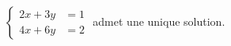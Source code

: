 $\begin{cases}2x+3y &= 1 \\ 4x+6y &= 2\end{cases}$ admet une unique solution.

\begin{reponses}
\end{reponses}


